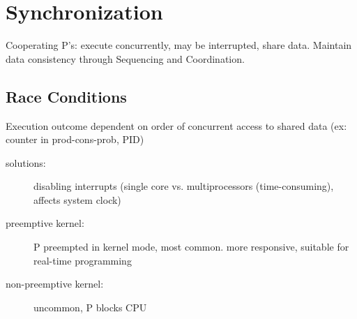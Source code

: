 \section*{Synchronization}
Cooperating P's: execute concurrently, may be interrupted, share data. Maintain data consistency through Sequencing and Coordination.
\subsection*{Race Conditions}
Execution outcome dependent on order of concurrent access to shared data (ex: counter in prod-cons-prob, PID)
\begin{description}
        \item[solutions:] disabling interrupts (single core vs. multiprocessors (time-consuming), affects system clock)
        \item[preemptive kernel:] P preempted in kernel mode, most common. more responsive, suitable for real-time programming
        \item [non-preemptive kernel:] uncommon, P blocks CPU
\end{description}

